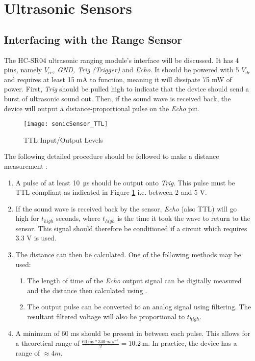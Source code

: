 \graphicspath{{content/1_literatureReview/figures/}}
\section{Ultrasonic Sensors}

\subsection{Interfacing with the Range Sensor}

The HC-SR04 ultrasonic ranging module's interface will be discussed. It has 4 pins, namely \textit{$V_{cc}$, GND, Trig (Trigger)} and \textit{Echo}.
It should be powered with 5 ${V_{dc}}$ and requires at least 15 mA to function, meaning it will dissipate 75 mW of power. 
First, \textit{Trig} should be pulled high to indicate that the device should send a burst of ultrasonic sound out.
Then, if the sound wave is received back, the device will output a distance-proportional pulse on the \textit{Echo} pin.

\begin{figure}[!htb]
  \centering
  \texttt{[image: sonicSensor\_TTL]}
  \caption{TTL Input/Output Levels \cite{ttlLevels}}
  \label{fig:sonicSensor_TTL}
\end{figure}

The following detailed procedure should be followed to make a distance measurement \cite{datasheetHCSR04}:
\begin{enumerate}
    \item A pulse of at least \SI{10}{\micro\second} should be output onto \textit{Trig}. This pulse must be TTL compliant as indicated
    in Figure \ref{fig:sonicSensor_TTL} i.e. between 2 and 5 V.
    \item If the sound wave is received back by the sensor, \textit{Echo} (also TTL) will go high for ${t_{high}}$ seconds, where ${t_{high}}$ is the time it took the wave to return to the sensor.
          This signal should therefore be conditioned if a circuit which requires 3.3 V is used.
    \item The distance can then be calculated. One of the following methods may be used:
    \begin{enumerate}
        \item The length of time of the \textit{Echo} output signal can be digitally measured and the distance then calculated using  \cite{datasheetHCSR04}.
        \item The output pulse can be converted to an analog signal using filtering. The resultant filtered voltage will also be proportional to $t_{high}$.
    \end{enumerate}
    \item A minimum of 60 ms should be present in between each pulse. This allows for a theoretical range of $\frac{\SI{60}{\milli\second} * \SI{340}{m.s^{-1}}}{2} = \SI{10.2}{\metre}$.
          In practice, the device has a range of $\approx 4 m$.
\end{enumerate}

